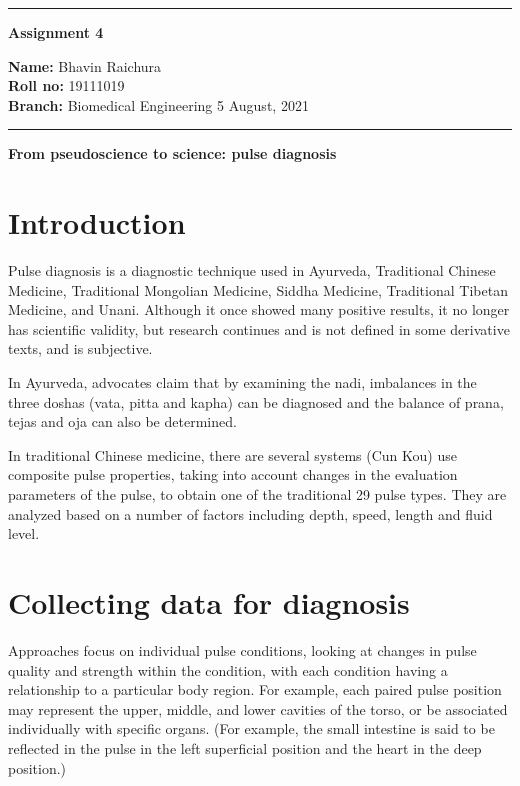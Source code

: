 \documentclass[10pt,a4paper,twoside]{article}
\begin{document}
\begin{center}
\hrule

\vspace{.3cm}
{\bf {\huge Assignment 4}}
\vspace{.3cm}
\end{center}
{\bf Name:}  Bhavin Raichura\\
{\bf Roll no:}  19111019 \\
{\bf Branch: }  Biomedical Engineering \hspace{\fill} 5 August, 2021 \\
\hrule

\vspace{.5cm}
\vspace{.4cm}
{\bf {\Large From pseudoscience to science: pulse diagnosis  }}\\


\section{Introduction}
\item
Pulse diagnosis is a diagnostic technique used in Ayurveda, Traditional Chinese Medicine, Traditional Mongolian Medicine, Siddha Medicine, Traditional Tibetan Medicine, and Unani. Although it once showed many positive results, it no longer has scientific validity, but research continues and is not defined in some derivative texts, and is subjective.
\item
In Ayurveda, advocates claim that by examining the nadi, imbalances in the three doshas (vata, pitta and kapha) can be diagnosed and the balance of prana, tejas and oja can also be determined.
\item
In traditional Chinese medicine, there are several systems (Cun Kou) use composite pulse properties, taking into account changes in the evaluation parameters of the pulse, to obtain one of the traditional 29 pulse types. They are analyzed based on a number of factors including depth, speed, length and fluid level.

\section{Collecting data for diagnosis}
Approaches focus on individual pulse conditions, looking at changes in pulse quality and strength within the condition, with each condition having a relationship to a particular body region. For example, each paired pulse position may represent the upper, middle, and lower cavities of the torso, or be associated individually with specific organs. (For example, the small intestine is said to be reflected in the pulse in the left superficial position and the heart in the deep position.)
\end{document}
